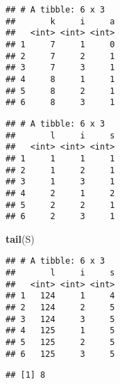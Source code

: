 \documentclass[
]{book}
\newenvironment{Shaded}{\begin{snugshade}}{\end{snugshade}}
\newcommand{\CommentTok}[1]{\textcolor[rgb]{0.56,0.35,0.01}{\textit{#1}}}
\newcommand{\KeywordTok}[1]{\textcolor[rgb]{0.13,0.29,0.53}{\textbf{#1}}}
\newcommand{\NormalTok}[1]{#1}
\newcommand{\OperatorTok}[1]{\textcolor[rgb]{0.81,0.36,0.00}{\textbf{#1}}}
\newcommand{\StringTok}[1]{\textcolor[rgb]{0.31,0.60,0.02}{#1}}
\begin{document}
\begin{verbatim}
## # A tibble: 6 x 3
##       k     i     a
##   <int> <int> <int>
## 1     7     1     0
## 2     7     2     1
## 3     7     3     1
## 4     8     1     1
## 5     8     2     1
## 6     8     3     1
\end{verbatim}

\begin{Shaded}
\end{Shaded}

\begin{verbatim}
## # A tibble: 6 x 3
##       l     i     s
##   <int> <int> <int>
## 1     1     1     1
## 2     1     2     1
## 3     1     3     1
## 4     2     1     2
## 5     2     2     1
## 6     2     3     1
\end{verbatim}

\begin{Shaded}
\begin{Highlighting}[]
\KeywordTok{tail}\NormalTok{(S)}
\end{Highlighting}
\end{Shaded}

\begin{verbatim}
## # A tibble: 6 x 3
##       l     i     s
##   <int> <int> <int>
## 1   124     1     4
## 2   124     2     5
## 3   124     3     5
## 4   125     1     5
## 5   125     2     5
## 6   125     3     5
\end{verbatim}

\begin{Shaded}
\end{Shaded}

\begin{verbatim}
## [1] 8
\end{verbatim}

\begin{Shaded}
\end{Shaded}
\end{document}
